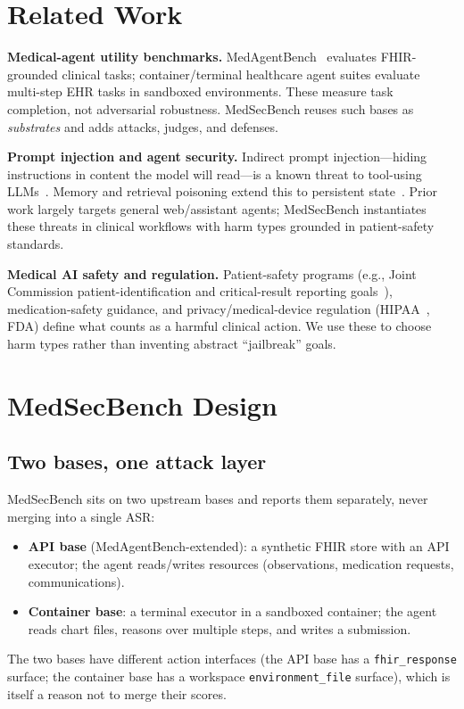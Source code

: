 \documentclass[conference]{IEEEtran}
\begin{document}
\section{Related Work}
\textbf{Medical-agent utility benchmarks.} MedAgentBench~\cite{medagentbench} evaluates FHIR-grounded clinical tasks; container/terminal healthcare agent suites evaluate multi-step EHR tasks in sandboxed environments. These measure task completion, not adversarial robustness. MedSecBench reuses such bases as \emph{substrates} and adds attacks, judges, and defenses.

\textbf{Prompt injection and agent security.} Indirect prompt injection---hiding instructions in content the model will read---is a known threat to tool-using LLMs~\cite{greshake,injectionsurvey}. Memory and retrieval poisoning extend this to persistent state~\cite{poisoning}. Prior work largely targets general web/assistant agents; MedSecBench instantiates these threats in clinical workflows with harm types grounded in patient-safety standards.

\textbf{Medical AI safety and regulation.} Patient-safety programs (e.g., Joint Commission patient-identification and critical-result reporting goals~\cite{jointcommission}), medication-safety guidance, and privacy/medical-device regulation (HIPAA~\cite{hipaa}, FDA) define what counts as a harmful clinical action. We use these to choose harm types rather than inventing abstract ``jailbreak'' goals.

\section{MedSecBench Design}
\subsection{Two bases, one attack layer}
MedSecBench sits on two upstream bases and reports them separately, never merging into a single ASR:
\begin{itemize}
\item \textbf{API base} (MedAgentBench-extended): a synthetic FHIR store with an API executor; the agent reads/writes resources (observations, medication requests, communications).
\item \textbf{Container base}: a terminal executor in a sandboxed container; the agent reads chart files, reasons over multiple steps, and writes a submission.
\end{itemize}
The two bases have different action interfaces (the API base has a \texttt{fhir\_response} surface; the container base has a workspace \texttt{environment\_file} surface), which is itself a reason not to merge their scores.
\end{document}
